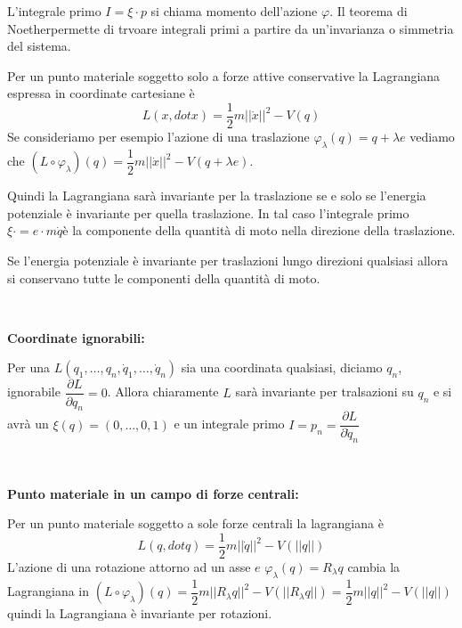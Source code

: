 \documentclass[11pt,a4paper,twoside]{book}
\newenvironment{esempio}[1][Esempio]{ 
  \begin{center}\begin{tcolorbox}[
  title={#1:\\},
  width=0.9\linewidth,
  flush right,
  enhanced jigsaw, 
  colback=white, 
  frame hidden, 
  sharpish corners, arc=3mm,
  borderline west = {1pt}{0pt}{gray},
  borderline south = {1pt}{0pt}{gray},
  coltitle=black, 
  fonttitle=\small\bfseries, 
  attach title to upper, 
  breakable,
  top=2.5pt, bottom=0.3pt]\small
  }{
 \normalsize \end{tcolorbox}\end{center}
}
\theoremstyle{esss}
\theoremstyle{dotless}
\numberwithin{equation}{section} %
\begin{document}

L'integrale primo $I=\xi\cdot p$ si chiama momento dell'azione $\varphi$.
Il teorema di Noether\footnotemark[2] permette di trvoare integrali primi a partire da un'invarianza o simmetria del sistema.


\begin{esempio}[Punto materiale non vincolato soggetto a forze attive conservative]
Per un punto materiale soggetto solo a forze attive conservative la Lagrangiana espressa in coordinate cartesiane è
\[
L(x,dot{x})=\dfrac{1}{2}m||\dot{x}||^2-V(q)
\] 
Se consideriamo per esempio l'azione di una traslazione $\varphi_\lambda(q)=q+\lambda e$ vediamo che $(L\circ\varphi_\lambda)(q)=\dfrac{1}{2}m||\dot{x}||^2-V(q+\lambda e)$.

Quindi la Lagrangiana sarà invariante per la traslazione se e solo se l'energia potenziale è invariante per quella traslazione.
In tal caso l'integrale primo $\xi\cdot = e\cdot m\dot{q}$è la componente della quantità di moto nella direzione della traslazione.

Se l'energia potenziale è invariante per traslazioni lungo direzioni qualsiasi allora si conservano tutte le componenti della quantità di moto.
\par ~\par\noindent
\textbf{Coordinate ignorabili:}\par\indent
Per una $L(q_1,\dots,q_n,\dot{q}_1,\dots,\dot{q}_n)$ sia una coordinata qualsiasi, diciamo $q_n$, ignorabile $\dfrac{\partial L}{\partial q_n}=0$. Allora chiaramente $L$ sarà invariante per tralsazioni su $q_n$ e si avrà un $\xi(q)=(0,\dots,0,1)$ e un integrale primo $I=p_n=\dfrac{\partial L}{\partial \dot{q}_n}$
\par ~\par\noindent
\textbf{Punto materiale in un campo di forze centrali:}\par\indent
Per un punto materiale soggetto a sole forze centrali la lagrangiana è
\[
L(q,dot{q})=\dfrac{1}{2}m||\dot{q}||^2-V(||q||)
\] 
L'azione di una rotazione attorno ad un asse $e$ $\varphi_\lambda(q)=R_\lambda q$ cambia la Lagrangiana in $(L\circ\varphi_\lambda)(q)=\dfrac{1}{2}m ||R_\lambda q||^2 -V(||R_\lambda q||)=\dfrac{1}{2}m ||q||^2 -V(||q||)$ quindi la Lagrangiana è invariante per rotazioni.


\end{esempio}
\end{document}
